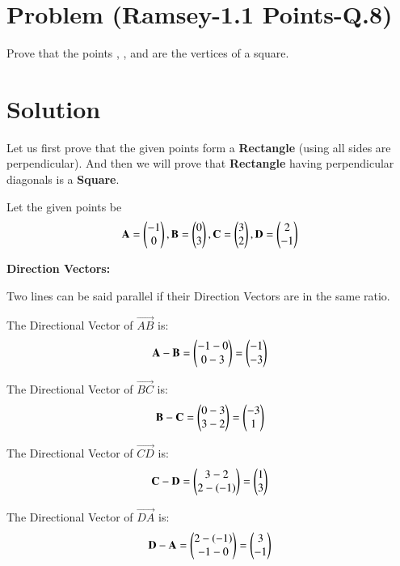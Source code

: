 \documentclass[journal,12pt,twocolumn]{IEEEtran}
\begin{document}
\section*{\textbf{Problem (Ramsey-1.1 Points-Q.8)}}
Prove that the points , ,  and  are the vertices of a square.
\section*{Solution}
Let us first prove that the given points form a \textbf{Rectangle} (using all sides are perpendicular). And then we will prove that \textbf{Rectangle} having perpendicular diagonals is a \textbf{Square}.

Let the given points be
\begin{equation}
\mathbf{A} = \begin{pmatrix}-1\\0\end{pmatrix}, \mathbf{B} = \begin{pmatrix}0\\3\end{pmatrix}, \mathbf{C} = \begin{pmatrix}3\\2\end{pmatrix}, \mathbf{D} = \begin{pmatrix}2\\-1\end{pmatrix}
\end{equation}

\textbf{Direction Vectors:}

Two lines can be said parallel if their Direction Vectors are in the same ratio.

The Directional Vector of $\vec{AB}$ is:
\begin{equation}
    \mathbf{A} - \mathbf{B} = \begin{pmatrix}-1-0\\0-3\end{pmatrix} = \begin{pmatrix}-1\\-3\end{pmatrix}
    \label{AB}
\end{equation}

The Directional Vector of $\vec{BC}$ is:
\begin{equation}
    \mathbf{B} - \mathbf{C} = \begin{pmatrix}0-3\\3-2\end{pmatrix} = \begin{pmatrix}-3\\1\end{pmatrix}
    \label{BC}
\end{equation}

The Directional Vector of $\vec{CD}$ is:
\begin{equation}
    \mathbf{C} - \mathbf{D} = \begin{pmatrix}3-2\\2-(-1)\end{pmatrix} = \begin{pmatrix}1\\3\end{pmatrix}
    \label{CD}
\end{equation}

The Directional Vector of $\vec{DA}$ is:
\begin{equation}
    \mathbf{D} - \mathbf{A} = \begin{pmatrix}2-(-1)\\-1-0\end{pmatrix} = \begin{pmatrix}3\\-1\end{pmatrix}
    \label{DA}
\end{equation}
\end{document}
